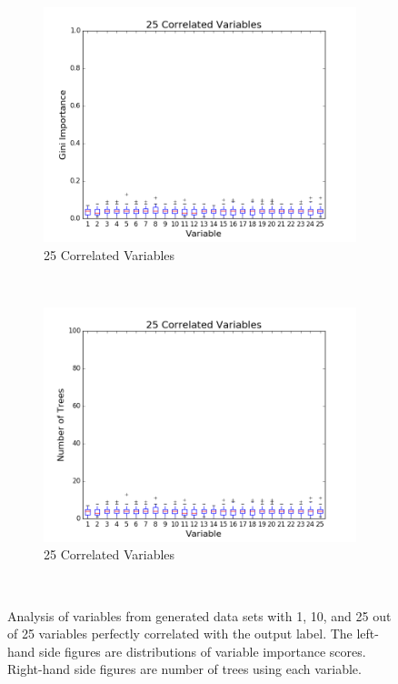 \begin{figure}[h!]
\begin{subfigure}[b]{0.45\textwidth}
    \includegraphics[width=\textwidth]{figures/random_forests/rf_correlated_1_0_25.png}
    \caption{25 Correlated Variables}
    \label{fig:corr-1-25}
  \end{subfigure}
  ~
  \begin{subfigure}[b]{0.45\textwidth}
    \includegraphics[width=\textwidth]{figures/random_forests/rf_correlated_1_0_25_feature_counts.png}
    \caption{25 Correlated Variables}
    \label{fig:corr-1-25-counts}
  \end{subfigure}
  ~
  \caption{Analysis of variables from generated data sets with 1, 10, and 25 out of 25 variables perfectly correlated with the output label. The left-hand side figures are distributions of variable importance scores. Right-hand side figures are number of trees using each variable.}
  \label{fig:corr-1}
\end{figure}



